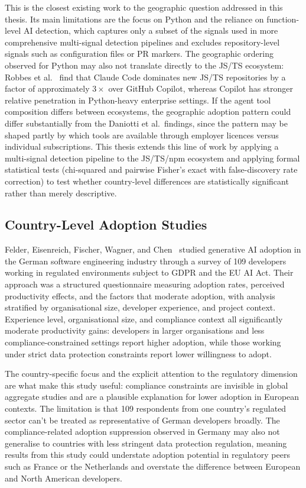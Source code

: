 This is the closest existing work to the geographic question addressed in this
thesis. Its main limitations are the focus on Python and the reliance on
function-level AI detection, which captures only a subset of the signals used in
more comprehensive multi-signal detection pipelines and excludes repository-level
signals such as configuration files or PR markers. The geographic ordering observed
for Python may also not translate directly to the JS/TS ecosystem: Robbes et
al.~\cite{robbesAgenticVery2026} find that Claude Code dominates new JS/TS
repositories by a factor of approximately $3\times$ over GitHub Copilot, whereas
Copilot has stronger relative penetration in Python-heavy enterprise settings.
If the agent tool composition differs between ecosystems, the geographic adoption
pattern could differ substantially from the Daniotti et al.\ findings, since the
pattern may be shaped partly by which tools are available through employer licences
versus individual subscriptions. This thesis extends this line of work by applying
a multi-signal detection pipeline to the JS/TS/npm ecosystem and applying formal
statistical tests (chi-squared and pairwise Fisher's exact with false-discovery rate
correction) to test whether country-level differences are statistically significant
rather than merely descriptive.

\subsection{Country-Level Adoption Studies}

Felder, Eisenreich, Fischer, Wagner, and Chen~\cite{felder2026} studied generative
AI adoption in the German software engineering industry through a survey of
109 developers working in regulated environments subject to GDPR and the EU AI Act.
Their approach was a structured questionnaire measuring adoption rates, perceived
productivity effects, and the factors that moderate adoption, with analysis
stratified by organisational size, developer experience, and project context.
Experience level, organisational size, and compliance context all significantly
moderate productivity gains: developers in larger organisations and
less compliance-constrained settings report higher adoption, while those working
under strict data protection constraints report lower willingness to adopt.

The country-specific focus and the explicit attention to the regulatory dimension
are what make this study useful: compliance constraints are invisible in global
aggregate studies and are a plausible explanation for lower adoption in European
contexts. The limitation is that 109 respondents from one country's regulated sector
can't be treated as representative of German developers broadly. The compliance-related
adoption suppression observed in Germany may also not generalise to countries with
less stringent data protection regulation, meaning results from this study could
understate adoption potential in regulatory peers such as France or the Netherlands
and overstate the difference between European and North American developers.

